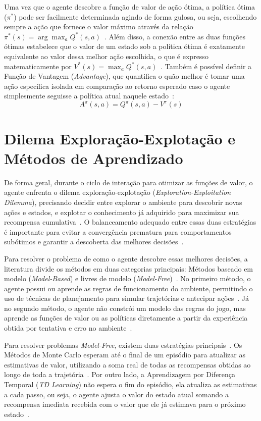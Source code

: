 Uma vez que o agente descobre a função de valor de ação ótima, a política ótima ($\pi^*$) pode ser facilmente determinada agindo de forma gulosa, ou seja, escolhendo sempre a ação que fornece o valor máximo através da relação $\pi^*(s) = \arg\max_a Q^*(s, a)$~\cite{hu2024, sutton2018}. Além disso, a conexão entre as duas funções ótimas estabelece que o valor de um estado sob a política ótima é exatamente equivalente ao valor dessa melhor ação escolhida, o que é expresso matematicamente por $V^*(s) = \max_a Q^*(s, a)$~\cite{hu2024, sutton2018}. Também é possível definir a Função de Vantagem (\textit{Advantage}), que quantifica o quão melhor é tomar uma ação específica isolada em comparação ao retorno esperado caso o agente simplesmente seguisse a política atual naquele estado~\cite{wang2016dueling}: 
\begin{equation} 
A^\pi(s, a) = Q^\pi(s, a) - V^\pi(s) 
\end{equation}

\section*{Dilema Exploração-Explotação e Métodos de Aprendizado}

De forma geral, durante o ciclo de interação para otimizar as funções de valor, o agente enfrenta o dilema exploração-explotação (\textit{Exploration-Exploitation Dilemma}), precisando decidir entre explorar o ambiente para descobrir novas ações e estados, e explotar o conhecimento já adquirido para maximizar sua recompensa cumulativa~\cite{sutton2018, hu2024}. O balanceamento adequado entre essas duas estratégias é importante para evitar a convergência prematura para comportamentos subótimos e garantir a descoberta das melhores decisões~\cite{hu2024}.

Para resolver o problema de como o agente descobre essas melhores decisões, a literatura divide os métodos em duas categorias principais: Métodos baseado em modelo (\textit{Model-Based}) e livres de modelo (\textit{Model-Free})~\cite{sutton2018, moerland2023}. No primeiro método, o agente possui ou aprende as regras de funcionamento do ambiente, permitindo o uso de técnicas de planejamento para simular trajetórias e antecipar ações~\cite{sutton2018, hu2024}. Já no segundo método, o agente não constrói um modelo das regras do jogo, mas aprende as funções de valor ou as políticas diretamente a partir da experiência obtida por tentativa e erro no ambiente~\cite{hu2024, sutton2018}.

Para resolver problemas \textit{Model-Free}, existem duas estratégias principais~\cite{sutton2018}. Os Métodos de Monte Carlo esperam até o final de um episódio para atualizar as estimativas de valor, utilizando a soma real de todas as recompensas obtidas ao longo de toda a trajetória~\cite{sutton2018, hu2024}. Por outro lado, a Aprendizagem por Diferença Temporal (\textit{TD Learning}) não espera o fim do episódio, ela atualiza as estimativas a cada passo, ou seja, o agente ajusta o valor do estado atual somando a recompensa imediata recebida com o valor que ele já estimava para o próximo estado~\cite{sutton2018}.

